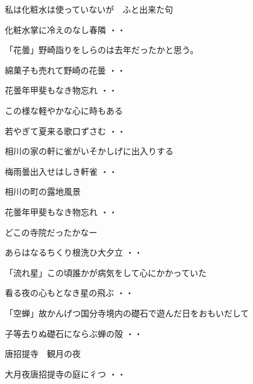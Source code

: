 \vspace{0.6cm}
私は化粧水は使っていないが　ふと出来た句
\begin{shiika}化粧水掌に冷えのなし春隣
\hfill{・・}\end{shiika}
\vspace{0.6cm}
「花曇」野崎詣りをしらのは去年だったかと思う。
\begin{shiika}綿菓子も売れて野崎の花曇
\hfill{・・}\end{shiika}
\begin{shiika}花曇年甲斐もなき物忘れ
\hfill{・・}\end{shiika}
\vspace{0.6cm}
この様な軽やかな心に時もある
\begin{shiika}若やぎて夏来る歌口ずさむ
\hfill{・・}\end{shiika}
\vspace{0.6cm}
相川の家の軒に雀がいそかしげに出入りする
\begin{shiika}梅雨曇出入せはしき軒雀
\hfill{・・}\end{shiika}
\vspace{0.6cm}
相川の町の露地風景
\begin{shiika}花曇年甲斐もなき物忘れ
\hfill{・・}\end{shiika}
\vspace{0.6cm}
どこの寺院だったかなー
\begin{shiika}あらはなるちくり根洗ひ大夕立
\hfill{・・}\end{shiika}
\vspace{0.6cm}
「流れ星」この頃誰かが病気をして心にかかっていた
\begin{shiika}看る夜の心もとなき星の飛ぶ
\hfill{・・}\end{shiika}
\vspace{0.6cm}
「空蝉」故かんげつ国分寺境内の礎石で遊んだ日をおもいだして
\begin{shiika}子等去りぬ礎石にならぶ蝉の殻
\hfill{・・}\end{shiika}
\vspace{0.6cm}
唐招提寺　観月の夜
\begin{shiika}大月夜唐招提寺の庭に彳つ
\hfill{・・}\end{shiika}
